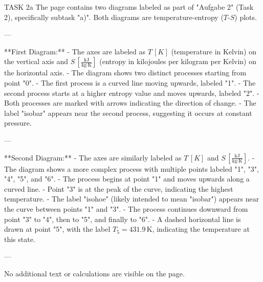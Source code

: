 TASK 2a  
The page contains two diagrams labeled as part of "Aufgabe 2" (Task 2), specifically subtask "a)". Both diagrams are temperature-entropy (\( T \)-\( S \)) plots.

---

**First Diagram:**  
- The axes are labeled as \( T \, [K] \) (temperature in Kelvin) on the vertical axis and \( S \, [\frac{\text{kJ}}{\text{kg·K}}] \) (entropy in kilojoules per kilogram per Kelvin) on the horizontal axis.  
- The diagram shows two distinct processes starting from point "0".  
- The first process is a curved line moving upwards, labeled "1".  
- The second process starts at a higher entropy value and moves upwards, labeled "2".  
- Both processes are marked with arrows indicating the direction of change.  
- The label "isobar" appears near the second process, suggesting it occurs at constant pressure.

---

**Second Diagram:**  
- The axes are similarly labeled as \( T \, [K] \) and \( S \, [\frac{\text{kJ}}{\text{kg·K}}] \).  
- The diagram shows a more complex process with multiple points labeled "1", "3", "4", "5", and "6".  
- The process begins at point "1" and moves upwards along a curved line.  
- Point "3" is at the peak of the curve, indicating the highest temperature.  
- The label "isohoe" (likely intended to mean "isobar") appears near the curve between points "1" and "3".  
- The process continues downward from point "3" to "4", then to "5", and finally to "6".  
- A dashed horizontal line is drawn at point "5", with the label \( T_5 = 431.9 \, \text{K} \), indicating the temperature at this state.

---

No additional text or calculations are visible on the page.